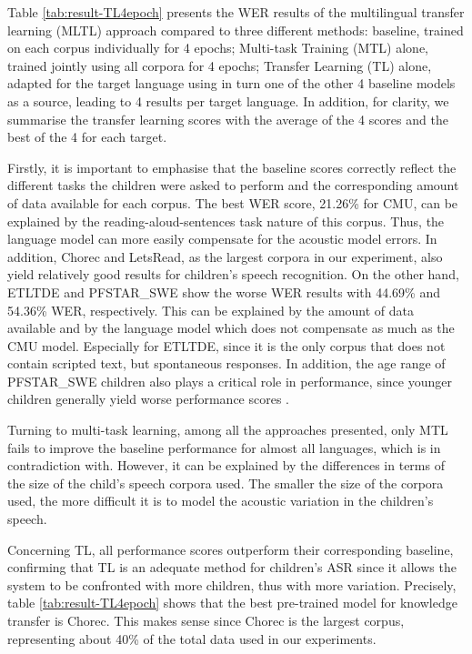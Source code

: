 Table \ref{tab:result-TL4epoch} presents the WER results of the multilingual transfer learning (MLTL) approach compared to three different methods: baseline, trained on each corpus individually for 4 epochs; Multi-task Training (MTL) alone, trained jointly using all corpora for 4 epochs; Transfer Learning (TL) alone, adapted for the target language using in turn one of the other 4 baseline models as a source, leading to 4 results per target language. In addition, for clarity, we summarise the transfer learning scores with the average of the 4 scores and the best of the 4 for each target.

Firstly, it is important to emphasise that the baseline scores correctly reflect the different tasks the children were asked to perform and the corresponding amount of data available for each corpus. The best WER score, 21.26\% for CMU, can be explained by the reading-aloud-sentences task nature of this corpus. Thus, the language model can more easily compensate for the acoustic model errors. In addition, Chorec and LetsRead, as the largest corpora in our experiment, also yield relatively good results for children's speech recognition. On the other hand, ETLTDE and PFSTAR\_SWE show the worse WER results with 44.69\%  and 54.36\% WER, respectively. This can be explained by the amount of data available and by the language model which does not compensate as much as the CMU model. Especially for ETLTDE, since it is the only corpus that does not contain scripted text, but spontaneous responses. In addition, the age range of PFSTAR\_SWE children also plays a critical role in performance, since younger children generally yield worse performance scores \cite{TFchildren}.

Turning to multi-task learning, among all the approaches presented, only MTL fails to improve the baseline performance for almost all languages, which is in contradiction with\cite{TransferLF}.  However, it can be explained by the differences in terms of the size of the child's speech corpora used. The smaller the size of the corpora used, the more difficult it is to model the acoustic variation in the children's speech.


Concerning TL, all performance scores outperform their corresponding baseline, confirming that TL is an adequate method for children's ASR since it allows the system to be confronted with more children, thus with more variation. Precisely, table \ref{tab:result-TL4epoch} shows that the best pre-trained model for knowledge transfer is Chorec.
This makes sense since Chorec is the largest corpus, representing about 40\% of the total data used in our experiments.


